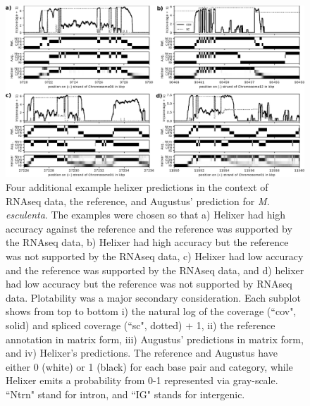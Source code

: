 \documentclass{article}
\renewcommand{\thefigure}{S\arabic{figure}}
\begin{document}
\begin{figure}[!h]
\label{supfig:cov_example_03}
\centerline{\includegraphics[width=\textwidth]{images/cov_examples/cov_example_003}}
\caption{
Four additional example helixer predictions in the context of RNAseq data, the reference,
and Augustus' prediction for {\it M. esculenta}. The examples were chosen so
that a) Helixer had high accuracy against the reference and the reference
was supported by the RNAseq data, b) Helixer had high accuracy but the
reference was not supported by the RNAseq data, c) Helixer had low accuracy
and the reference was supported by the RNAseq data, and d) helixer had low
accuracy but the reference was not supported by RNAseq data. Plotability was
a major secondary consideration. Each subplot shows from top to
bottom i) the natural log of the coverage (``cov", solid) and spliced coverage
(``sc", dotted) + 1, ii) the reference annotation in matrix form, iii)
Augustus' predictions in matrix form, and iv) Helixer's predictions. The reference
and Augustus have either 0 (white) or 1 (black) for each base pair and category, while
Helixer emits a probability from 0-1 represented via gray-scale. ``Ntrn" stand
for intron, and ``IG" stands for intergenic.
}
\end{figure}
\end{document}
